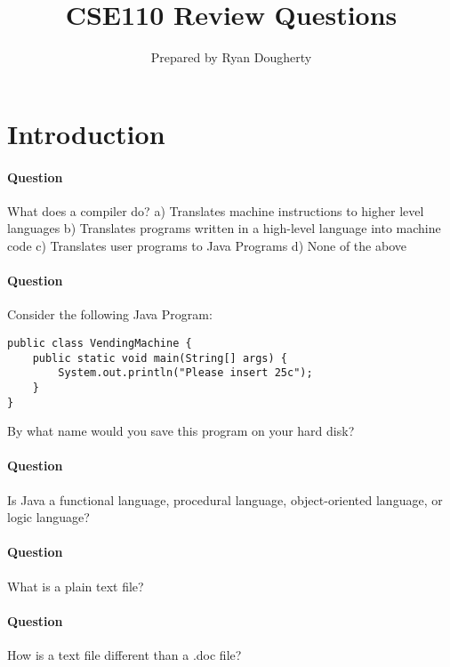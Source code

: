 \documentclass{article}
\title{CSE110 Review Questions}
\author{Prepared by Ryan Dougherty}
\date{}
\begin{document}
\maketitle

\section*{Introduction}

\setcounter{question_num}{1}
\paragraph{Question }
What does a compiler do?
\newline a) Translates machine instructions to higher level languages
\newline b) Translates programs written in a high-level language into machine code
\newline c) Translates user programs to Java Programs
\newline d) None of the above

\addtocounter{question_num}{1}
\paragraph{Question }
Consider the following Java Program:
\begin{lstlisting}
public class VendingMachine {
	public static void main(String[] args) {
		System.out.println("Please insert 25c");
	}
}
\end{lstlisting}
By what name would you save this program on your hard disk?

\addtocounter{question_num}{1}
\paragraph{Question }
Is Java a functional language, procedural language, object-oriented language, or logic language?

\addtocounter{question_num}{1}
\paragraph{Question }
What is a plain text file?

\addtocounter{question_num}{1}
\paragraph{Question }
How is a text file different than a .doc file?
\end{document}

